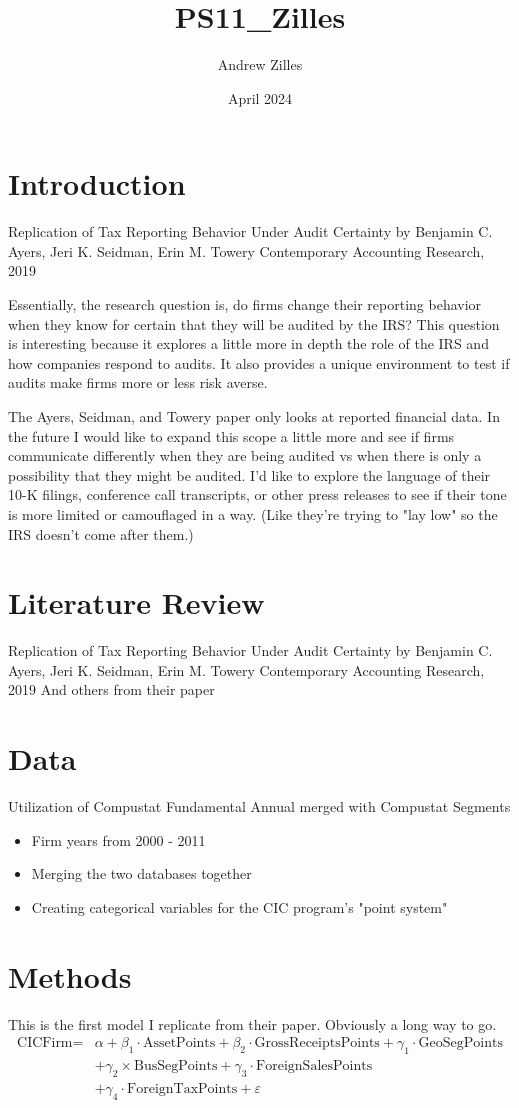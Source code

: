 \documentclass{article}
\title{PS11_Zilles}
\author{Andrew Zilles}
\date{April 2024}
\begin{document}
\section{Introduction}
Replication of Tax Reporting Behavior Under Audit Certainty
by Benjamin C. Ayers, Jeri K. Seidman, Erin M. Towery
Contemporary Accounting Research, 2019

Essentially, the research question is, do firms change their reporting behavior when they know for certain that they will be audited by the IRS? This question is interesting because it explores a little more in depth the role of the IRS and how companies respond to audits. It also provides a unique environment to test if audits make firms more or less risk averse.

The Ayers, Seidman, and Towery paper only looks at reported financial data. In the future I would like to expand this scope a little more and see if firms communicate differently when they are being audited vs when there is only a possibility that they might be audited. I'd like to explore the language of their 10-K filings, conference call transcripts, or other press releases to see if their tone is more limited or camouflaged in a way. (Like they're trying to "lay low" so the IRS doesn't come after them.)

\section{Literature Review}
Replication of Tax Reporting Behavior Under Audit Certainty
by Benjamin C. Ayers, Jeri K. Seidman, Erin M. Towery
Contemporary Accounting Research, 2019
And others from their paper

\section{Data}
Utilization of Compustat Fundamental Annual merged with Compustat Segments
\begin{itemize}
    \item Firm years from 2000 - 2011
    \item Merging the two databases together
    \item Creating categorical variables for the CIC program's "point system"
\end{itemize}

\section{Methods}
This is the first model I replicate from their paper. Obviously a long way to go.
\begin{equation}
\begin{aligned}
\text{CICFirm} = &\alpha + \beta_1 \cdot \text{AssetPoints} + \beta_2 \cdot \text{GrossReceiptsPoints} + \gamma_1 \cdot \text{GeoSegPoints} \\
&+ \gamma_2 \times \text{BusSegPoints} + \gamma_3 \cdot \text{ForeignSalesPoints} \\
&+ \gamma_4 \cdot \text{ForeignTaxPoints} + \varepsilon
\end{aligned}
\end{equation}
\end{document}
